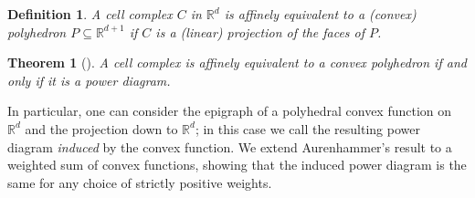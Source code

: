 \documentclass[12pt]{article}
\newcommand{\reals}{\mathbb{R}}
\newtheorem{theorem}{Theorem}
\newtheorem{definition}{Definition}
\begin{document}
\begin{definition}\label{def:affine-equiv}
  A cell complex $C$ in $\reals^d$ is \emph{affinely equivalent} to a (convex) polyhedron $P \subseteq \reals^{d+1}$ if $C$ is a (linear) projection of the faces of $P$.
\end{definition}

\begin{theorem}[\cite{aurenhammer1987power}]\label{thm:aurenhammer}
  A cell complex is affinely equivalent to a convex polyhedron if and only if it is a power diagram.
\end{theorem}

In particular, one can consider the epigraph of a polyhedral convex function on $\reals^d$ and the projection down to $\reals^d$; in this case we call the resulting power diagram \emph{induced} by the convex function.
We extend Aurenhammer's result to a weighted sum of convex functions, showing that the induced power diagram is the same for any choice of strictly positive weights.
\end{document}
